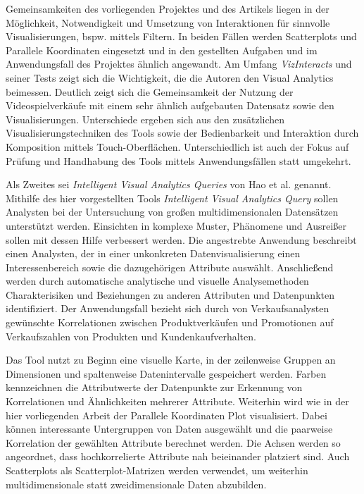 \documentclass[usegeometry=true]{scrartcl}
\begin{document}
Gemeinsamkeiten des vorliegenden Projektes und des Artikels liegen in der Möglichkeit, Notwendigkeit und 
Umsetzung von Interaktionen für sinnvolle Visualisierungen, bspw. mittels Filtern.
In beiden Fällen werden Scatterplots und Parallele Koordinaten eingesetzt und in den gestellten Aufgaben und 
im Anwendungsfall des Projektes ähnlich angewandt. 
Am Umfang \textit{VizInteracts} und seiner Tests zeigt sich die Wichtigkeit, die die Autoren den Visual Analytics beimessen.
Deutlich zeigt sich die Gemeinsamkeit der Nutzung der Videospielverkäufe mit einem sehr ähnlich aufgebauten Datensatz sowie den Visualisierungen.
Unterschiede ergeben sich aus den zusätzlichen Visualisierungstechniken des Tools sowie der Bedienbarkeit und Interaktion durch Komposition mittels Touch-Oberflächen. 
Unterschiedlich ist auch der Fokus auf Prüfung und Handhabung des Tools mittels Anwendungsfällen statt umgekehrt.

Als Zweites sei \textit{Intelligent Visual Analytics Queries} von Hao et al. genannt.\cite{Hao.2007}
Mithilfe des hier vorgestellten Tools \textit{Intelligent Visual Analytics Query} sollen Analysten bei der Untersuchung 
von großen multidimensionalen Datensätzen unterstützt werden.
Einsichten in komplexe Muster, Phänomene und Ausreißer sollen mit dessen Hilfe verbessert werden.
Die angestrebte Anwendung beschreibt einen Analysten, der in einer unkonkreten Datenvisualisierung einen Interessenbereich 
sowie die dazugehörigen Attribute auswählt.
Anschließend werden durch automatische analytische und visuelle Analysemethoden Charakterisiken und Beziehungen 
zu anderen Attributen und Datenpunkten identifiziert.
Der Anwendungsfall bezieht sich durch von Verkaufsanalysten gewünschte Korrelationen zwischen Produktverkäufen und Promotionen 
auf Verkaufszahlen von Produkten und Kundenkaufverhalten.

Das Tool nutzt zu Beginn eine visuelle Karte, in der zeilenweise Gruppen an Dimensionen und spaltenweise Datenintervalle gespeichert werden.
Farben kennzeichnen die Attributwerte der Datenpunkte zur Erkennung von Korrelationen und Ähnlichkeiten mehrerer Attribute.
Weiterhin wird wie in der hier vorliegenden Arbeit der Parallele Koordinaten Plot visualisiert. 
Dabei können interessante Untergruppen von Daten ausgewählt und die paarweise Korrelation der gewählten Attribute berechnet werden. 
Die Achsen werden so angeordnet, dass hochkorrelierte Attribute nah beieinander platziert sind. 
Auch Scatterplots als Scatterplot-Matrizen werden verwendet, um weiterhin multidimensionale statt zweidimensionale Daten abzubilden.
\end{document}

